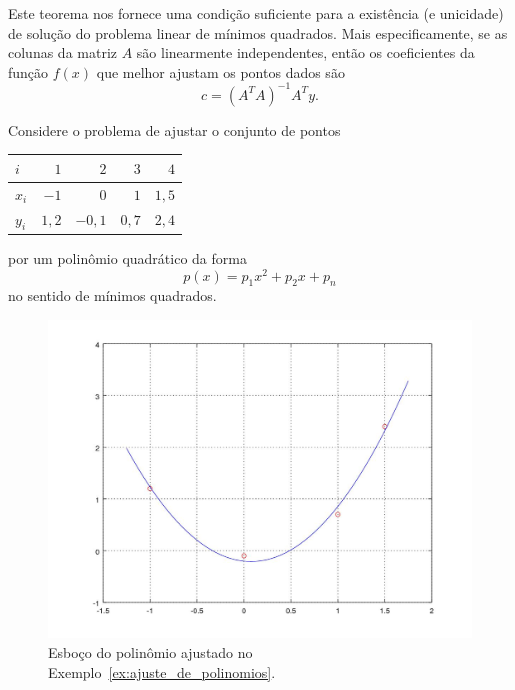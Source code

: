 Este teorema nos fornece uma condição suficiente para a existência (e unicidade) de solução do problema linear de mínimos quadrados. Mais especificamente, se as colunas da matriz $A$ são linearmente independentes, então os coeficientes da função $f(x)$ que melhor ajustam os pontos dados são
\begin{equation}
  c = (A^TA)^{-1}A^Ty.
\end{equation}

\begin{ex}\label{ex:ajuste_de_polinomios}
  Considere o problema de ajustar o conjunto de pontos
  \begin{center}
    \begin{tabular}{l|rrrr}
      $i$ & $1$ & $2$ & $3$ & $4$ \\\hline
      $x_i$ & $-1$ & $0$ & $1$ & $1,5$\\
      $y_i$ & $1,2$ & $-0,1$ & $0,7$ & $2,4$\\\hline
    \end{tabular}
  \end{center}
  por um polinômio quadrático da forma
  \begin{equation}
    p(x) = p_1x^2 + p_2x + p_n
  \end{equation}
  no sentido de mínimos quadrados.  

  \begin{figure}[h]
    \centering
    \includegraphics[width=\textwidth]{cap_ajuste/dados/ex_mq_poli/ex_mq_poli}
    \caption{Esboço do polinômio ajustado no Exemplo~\ref{ex:ajuste_de_polinomios}.}
    \label{fig:ex_mq_poli}
  \end{figure}
  

\end{ex}
